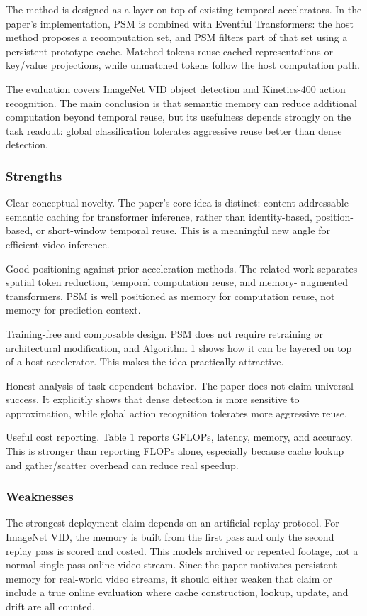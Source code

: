 \documentclass[11pt]{article}
\begin{document}
The method is designed as a layer on top of existing temporal accelerators. In the paper's implementation, PSM is combined with Eventful Transformers: the host method proposes a recomputation set, and PSM filters part of that set using a persistent prototype cache. Matched tokens reuse cached representations or key/value projections, while unmatched tokens follow the host computation path.

The evaluation covers ImageNet VID object detection and Kinetics-400 action recognition. The main conclusion is that semantic memory can reduce additional computation beyond temporal reuse, but its usefulness depends strongly on the task readout: global classification tolerates aggressive reuse better than dense detection.

\subsubsection*{Strengths}
Clear conceptual novelty. The paper's core idea is distinct: content-addressable semantic caching for transformer inference, rather than identity-based, position-based, or short-window temporal reuse. This is a meaningful new angle for efficient video inference.

Good positioning against prior acceleration methods. The related work separates spatial token reduction, temporal computation reuse, and memory- augmented transformers. PSM is well positioned as memory for computation reuse, not memory for prediction context.

Training-free and composable design. PSM does not require retraining or architectural modification, and Algorithm 1 shows how it can be layered on top of a host accelerator. This makes the idea practically attractive.

Honest analysis of task-dependent behavior. The paper does not claim universal success. It explicitly shows that dense detection is more sensitive to approximation, while global action recognition tolerates more aggressive reuse.

Useful cost reporting. Table 1 reports GFLOPs, latency, memory, and accuracy. This is stronger than reporting FLOPs alone, especially because cache lookup and gather/scatter overhead can reduce real speedup.

\subsubsection*{Weaknesses}
The strongest deployment claim depends on an artificial replay protocol. For ImageNet VID, the memory is built from the first pass and only the second replay pass is scored and costed. This models archived or repeated footage, not a normal single-pass online video stream. Since the paper motivates persistent memory for real-world video streams, it should either weaken that claim or include a true online evaluation where cache construction, lookup, update, and drift are all counted.
\end{document}
